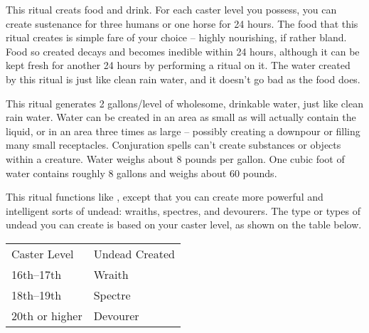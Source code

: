 \spelleffect This ritual creats food and drink. For each caster level you possess, you can create sustenance for three humans or one horse for 24 hours. The food that this ritual creates is simple fare of your choice -- highly nourishing, if rather bland. Food so created decays and becomes inedible within 24 hours, although it can be kept fresh for another 24 hours by performing a  ritual on it. The water created by this ritual is just like clean rain water, and it doesn't go bad as the food does.

\spelleffect This ritual generates 2 gallons/level of wholesome, drinkable water, just like clean rain water. Water can be created in an area as small as will actually contain the liquid, or in an area three times as large -- possibly creating a downpour or filling many small receptacles.
\spellnotes Conjuration spells can't create substances or objects within a creature. Water weighs about 8 pounds per gallon. One cubic foot of water contains roughly 8 gallons and weighs about 60 pounds.

\spelleffect This ritual functions like , except that you can create more powerful and intelligent sorts of undead: wraiths, spectres, and devourers. The type or types of undead you can create is based on your caster level, as shown on the table below.
\begin{dtable}
    \begin{tabularx}{\columnwidth}{*{2}{>{\lcol}X}}
        Caster Level & Undead Created \\
        16th--17th & Wraith \\
        18th--19th & Spectre \\
        20th or higher & Devourer \\
    \end{tabularx}
\end{dtable}

